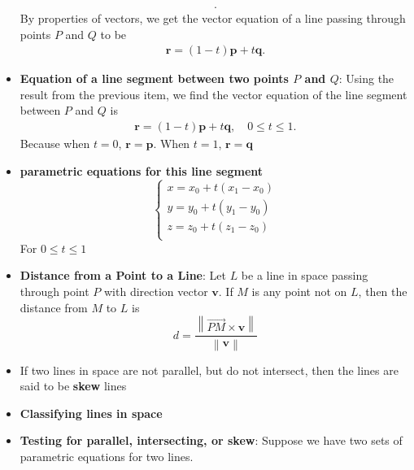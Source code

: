 \documentclass{report}
\begin{document}
\begin{itemize}
\begin{align*}
            .\end{align*} 
            By properties of vectors, we get the vector equation of a line passing through points $P$ and $Q$ to be 
            \begin{align*}
                \mathbf{r} = (1-t)\mathbf{p} + t\mathbf{q}
            .\end{align*}
        \item \textbf{Equation of a line segment between two points $P$ and $Q$}: Using the result from the previous item, we find the vector equation of the line segment between  $P$ and $Q$ is
            \begin{align*}
                \mathbf{r} = (1-t)\mathbf{p} + t\mathbf{q}, \quad 0 \leq t \leq 1
            .\end{align*}
            \bigbreak \noindent 
            Because when $t=0$, $\mathbf{r} = \mathbf{p}$. When $t=1$, $\mathbf{r}=\mathbf{q}$
        \item \textbf{parametric equations for this line segment}
               \begin{equation}
                    \begin{cases}
                        x =  x_{0}+ t(x_{1} - x_{0})\\
                        y =  y_{0}+ t(y_{1} - y_{0})\\
                        z =  z_{0}+ t(z_{1} - z_{0})\\
                    \end{cases}
                \end{equation}
            For $0 \leq t \leq 1 $
        \item \textbf{Distance from a Point to a Line}:
            Let $L$ be a line in space passing through point $P$ with direction vector $\mathbf{v}$. If $M$ is any point not on $L$, then the distance from $M$ to $L$ is
            \[
                d = \frac{\left\| \overrightarrow{PM} \times \mathbf{v} \right\|}{\left\| \mathbf{v} \right\|}
            \]
        \item If two lines in space are not parallel, but do not intersect, then the lines are said to be \textbf{skew} lines
        \item \textbf{Classifying lines in space}
            \bigbreak \noindent 
        \item \textbf{Testing for parallel, intersecting, or skew}: Suppose we have two sets of parametric equations for two lines.
            \begin{itemize}

\end{itemize}
\end{itemize}
\end{document}
